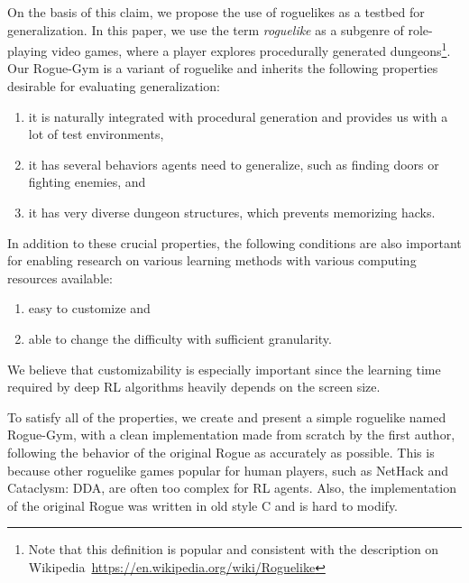 \documentclass[conference]{IEEEtran}
\begin{document}
On the basis of this claim, we propose the use of roguelikes as a testbed for
generalization.
In this paper, we use the term \textit{roguelike} as a subgenre of
role-playing video games, where a player explores procedurally generated
dungeons\footnote{Note that this definition is popular and consistent
with the description on
Wikipedia~\url{https://en.wikipedia.org/wiki/Roguelike}}.
Our Rogue-Gym is a variant of roguelike and inherits the following
properties desirable for evaluating generalization:
\begin{enumerate}
 \item it is naturally integrated with procedural generation and provides
       us with a lot of test environments,
 \item it has several behaviors agents need to generalize, such as finding
       doors or fighting enemies, and
 \item it has very diverse dungeon structures, which prevents memorizing
       hacks.
\end{enumerate}

In addition to these crucial properties, the following conditions are also important
for enabling research on various learning methods with various computing resources available:
\begin{enumerate}
 \item easy to customize and
 \item able to change the difficulty with sufficient granularity.
\end{enumerate}
We believe that customizability is especially important since the
learning time required by deep RL algorithms heavily depends on the
screen size.

To satisfy all of the properties, we create and present a simple roguelike
named Rogue-Gym, with a clean implementation made from scratch by the first
author, following the behavior of the original Rogue as accurately as
possible.
This is because other roguelike games popular for human players, such as NetHack and
Cataclysm: DDA, are often too complex for RL agents.
Also, the implementation of the original Rogue was written in old style
C and is hard to modify.
\end{document}
